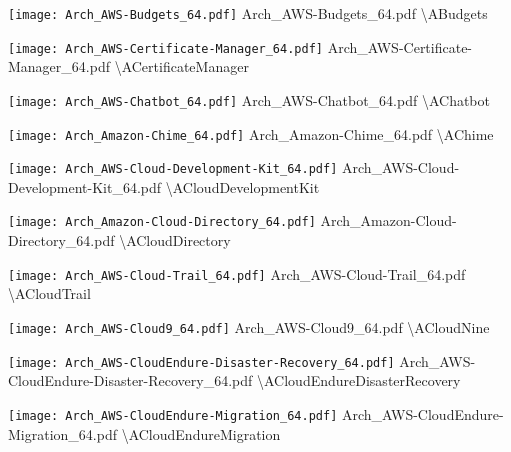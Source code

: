  {\texttt{[image: Arch\_AWS-Budgets\_64.pdf]}} {Arch\_AWS-Budgets\_64.pdf} {{\textbackslash}ABudgets}

 {\texttt{[image: Arch\_AWS-Certificate-Manager\_64.pdf]}} {Arch\_AWS-Certificate-Manager\_64.pdf} {{\textbackslash}ACertificateManager}

 {\texttt{[image: Arch\_AWS-Chatbot\_64.pdf]}} {Arch\_AWS-Chatbot\_64.pdf} {{\textbackslash}AChatbot}

 {\texttt{[image: Arch\_Amazon-Chime\_64.pdf]}} {Arch\_Amazon-Chime\_64.pdf} {{\textbackslash}AChime}

 {\texttt{[image: Arch\_AWS-Cloud-Development-Kit\_64.pdf]}} {Arch\_AWS-Cloud-Development-Kit\_64.pdf} {{\textbackslash}ACloudDevelopmentKit}

 {\texttt{[image: Arch\_Amazon-Cloud-Directory\_64.pdf]}} {Arch\_Amazon-Cloud-Directory\_64.pdf} {{\textbackslash}ACloudDirectory}

 {\texttt{[image: Arch\_AWS-Cloud-Trail\_64.pdf]}} {Arch\_AWS-Cloud-Trail\_64.pdf} {{\textbackslash}ACloudTrail}

 {\texttt{[image: Arch\_AWS-Cloud9\_64.pdf]}} {Arch\_AWS-Cloud9\_64.pdf} {{\textbackslash}ACloudNine}

 {\texttt{[image: Arch\_AWS-CloudEndure-Disaster-Recovery\_64.pdf]}} {Arch\_AWS-CloudEndure-Disaster-Recovery\_64.pdf} {{\textbackslash}ACloudEndureDisasterRecovery}

 {\texttt{[image: Arch\_AWS-CloudEndure-Migration\_64.pdf]}} {Arch\_AWS-CloudEndure-Migration\_64.pdf} {{\textbackslash}ACloudEndureMigration}

